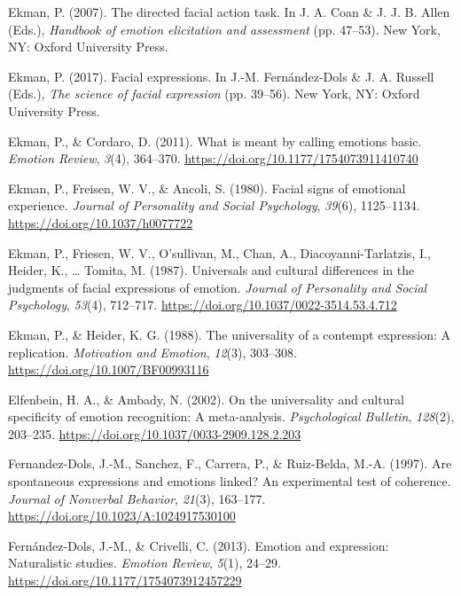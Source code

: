 \documentclass[
  english,
  doc]{apa7}
\newlength{\cslhangindent}
\newenvironment{cslreferences}%
  {\setlength{\parindent}{0pt}%
  \everypar{\setlength{\hangindent}{\cslhangindent}}\ignorespaces}%
  {\par}
\begin{document}
\begin{cslreferences}
\leavevmode\hypertarget{ref-ekman2007directed}{}%
Ekman, P. (2007). The directed facial action task. In J. A. Coan \& J. J. B. Allen (Eds.), \emph{Handbook of emotion elicitation and assessment} (pp. 47--53). New York, NY: Oxford University Press.

\leavevmode\hypertarget{ref-ekman2017facial}{}%
Ekman, P. (2017). Facial expressions. In J.-M. Fernández-Dols \& J. A. Russell (Eds.), \emph{The science of facial expression} (pp. 39--56). New York, NY: Oxford University Press.

\leavevmode\hypertarget{ref-ekman2011meant}{}%
Ekman, P., \& Cordaro, D. (2011). What is meant by calling emotions basic. \emph{Emotion Review}, \emph{3}(4), 364--370. \url{https://doi.org/10.1177/1754073911410740}

\leavevmode\hypertarget{ref-ekman1980facial}{}%
Ekman, P., Freisen, W. V., \& Ancoli, S. (1980). Facial signs of emotional experience. \emph{Journal of Personality and Social Psychology}, \emph{39}(6), 1125--1134. \url{https://doi.org/10.1037/h0077722}

\leavevmode\hypertarget{ref-ekman1987universals}{}%
Ekman, P., Friesen, W. V., O'sullivan, M., Chan, A., Diacoyanni-Tarlatzis, I., Heider, K., \ldots{} Tomita, M. (1987). Universals and cultural differences in the judgments of facial expressions of emotion. \emph{Journal of Personality and Social Psychology}, \emph{53}(4), 712--717. \url{https://doi.org/10.1037/0022-3514.53.4.712}

\leavevmode\hypertarget{ref-ekman1988universality}{}%
Ekman, P., \& Heider, K. G. (1988). The universality of a contempt expression: A replication. \emph{Motivation and Emotion}, \emph{12}(3), 303--308. \url{https://doi.org/10.1007/BF00993116}

\leavevmode\hypertarget{ref-elfenbein2002universality}{}%
Elfenbein, H. A., \& Ambady, N. (2002). On the universality and cultural specificity of emotion recognition: A meta-analysis. \emph{Psychological Bulletin}, \emph{128}(2), 203--235. \url{https://doi.org/10.1037/0033-2909.128.2.203}

\leavevmode\hypertarget{ref-fernandez1997spontaneous}{}%
Fernandez-Dols, J.-M., Sanchez, F., Carrera, P., \& Ruiz-Belda, M.-A. (1997). Are spontaneous expressions and emotions linked? An experimental test of coherence. \emph{Journal of Nonverbal Behavior}, \emph{21}(3), 163--177. \url{https://doi.org/10.1023/A:1024917530100}

\leavevmode\hypertarget{ref-fernandez2013emotion}{}%
Fernández-Dols, J.-M., \& Crivelli, C. (2013). Emotion and expression: Naturalistic studies. \emph{Emotion Review}, \emph{5}(1), 24--29. \url{https://doi.org/10.1177/1754073912457229}


\end{cslreferences}
\end{document}
